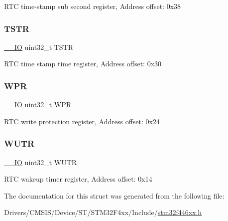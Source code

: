 R\+TC time-\/stamp sub second register, Address offset\+: 0x38 \mbox{\label{struct_r_t_c___type_def_a042059c8b4168681d6aecf30211dd7b8}} 
\subsubsection{\texorpdfstring{T\+S\+TR}{TSTR}}
{\footnotesize\ttfamily \mbox{\hyperlink{core__sc300_8h_aec43007d9998a0a0e01faede4133d6be}{\+\_\+\+\_\+\+IO}} uint32\+\_\+t T\+S\+TR}

R\+TC time stamp time register, Address offset\+: 0x30 \mbox{\label{struct_r_t_c___type_def_a6204786b050eb135fabb15784698e86e}} 
\subsubsection{\texorpdfstring{W\+PR}{WPR}}
{\footnotesize\ttfamily \mbox{\hyperlink{core__sc300_8h_aec43007d9998a0a0e01faede4133d6be}{\+\_\+\+\_\+\+IO}} uint32\+\_\+t W\+PR}

R\+TC write protection register, Address offset\+: 0x24 \mbox{\label{struct_r_t_c___type_def_ac5b3c8be61045a304d3076d4714d29f2}} 
\subsubsection{\texorpdfstring{W\+U\+TR}{WUTR}}
{\footnotesize\ttfamily \mbox{\hyperlink{core__sc300_8h_aec43007d9998a0a0e01faede4133d6be}{\+\_\+\+\_\+\+IO}} uint32\+\_\+t W\+U\+TR}

R\+TC wakeup timer register, Address offset\+: 0x14 

The documentation for this struct was generated from the following file\+:\begin{DoxyCompactItemize}
\item 
Drivers/\+C\+M\+S\+I\+S/\+Device/\+S\+T/\+S\+T\+M32\+F4xx/\+Include/\mbox{\hyperlink{stm32f446xx_8h}{stm32f446xx.\+h}}\end{DoxyCompactItemize}
